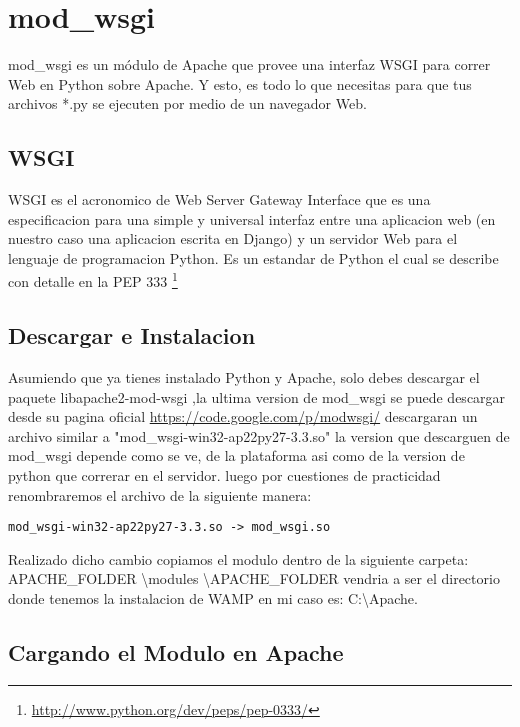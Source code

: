\section{mod\_wsgi}

mod\_wsgi es un módulo de Apache que provee una interfaz WSGI para correr
 Web en Python sobre Apache. Y esto, es todo lo que necesitas para que tus
 archivos *.py se ejecuten por medio de un navegador Web.

\subsection{WSGI}

WSGI es el acronomico de Web Server Gateway Interface que es una especificacion
para una simple y universal interfaz entre una aplicacion web (en nuestro caso
una aplicacion escrita en Django) y un servidor Web para el lenguaje de programacion
Python. Es un estandar de Python el cual se describe con detalle en la PEP 333
\footnote{\url{http://www.python.org/dev/peps/pep-0333/}}


\subsection{Descargar e Instalacion}

 Asumiendo que ya  tienes instalado Python y Apache, solo debes descargar el paquete
 libapache2-mod-wsgi ,la ultima version de mod\_wsgi se puede descargar desde su
 pagina oficial \url{https://code.google.com/p/modwsgi/} descargaran un archivo
 similar a "mod\_wsgi-win32-ap22py27-3.3.so" la version que descarguen de mod\_wsgi
 depende como se ve, de la plataforma asi como de la version de python que
 correrar en el servidor. luego por cuestiones de practicidad renombraremos
 el archivo de la siguiente manera:

\begin{lstlisting}[style=consola]
    mod_wsgi-win32-ap22py27-3.3.so -> mod_wsgi.so
\end{lstlisting}
\vspace{0.1cm}

Realizado dicho cambio copiamos el modulo dentro de la siguiente carpeta:
APACHE\_FOLDER \textbackslash modules \textbackslash APACHE\_FOLDER vendria a
ser el directorio donde tenemos la instalacion de WAMP en mi caso es:
C:\textbackslash Apache.

\subsection{Cargando el Modulo en Apache}

